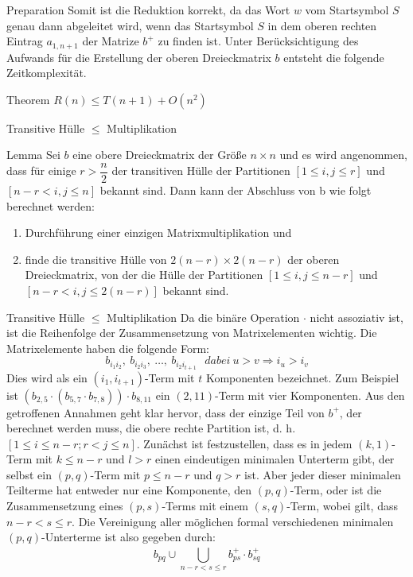 \documentclass{beamer}
\begin{document}
	\begin{frame}{Preparation}
		Somit ist die Reduktion korrekt, da das Wort $w$ vom Startsymbol $S$ genau dann abgeleitet wird, wenn das Startsymbol $S$ in dem oberen rechten Eintrag $a_{1,n+1}$ der Matrize $b^+$ zu finden ist. Unter Berücksichtigung des Aufwands für die Erstellung der oberen Dreieckmatrix $b$ entsteht die folgende Zeitkomplexität.
		\begin{block}{Theorem}
			$R(n) \le T(n+1) + O(n^2)$
		\end{block}
	\end{frame}

	\begin{frame}{Transitive Hülle $\le$ Multiplikation}
		\begin{block}{Lemma}
			Sei $b$ eine obere Dreieckmatrix der Größe $n \times n$
			und es wird angenommen, dass für einige $r > \dfrac{n}{2}$ der transitiven Hülle der Partitionen $[1\le i,j\le r]$ und $[n-r < i,j\le n]$ bekannt sind. Dann kann der Abschluss von b wie folgt berechnet werden:
			\begin{enumerate}
				\item Durchführung einer einzigen Matrixmultiplikation und
				\item finde die transitive Hülle von $2(n-r) \times 2(n-r)$ der oberen Dreieckmatrix, von der
				die Hülle der Partitionen $[1\le i,j\le n-r]$ und $[n-r < i,j\le 2(n-r)]$ bekannt sind.
			\end{enumerate}
		\end{block}
	
	\end{frame}

	\begin{frame}{Transitive Hülle $\le$ Multiplikation}
		Da die binäre Operation $\cdot$ nicht assoziativ ist, ist die Reihenfolge der Zusammensetzung von Matrixelementen wichtig. Die Matrixelemente haben die folgende Form:
		$$b_{i_1 i_2},\ b_{i_2 i_3},\ \ldots,\ b_{i_2 i_{t+1}} \ \ \ dabei \ u > v \Rightarrow  i_u > i_v$$
		Dies wird als ein $(i_1,i_{t+1})$-Term mit $t$ Komponenten bezeichnet. Zum Beispiel ist $(b_{2,5}\cdot (b_{5,7}\cdot b_{7,8}))\cdot b_{8,11}$ ein $(2, 11)$-Term mit vier Komponenten.
		Aus den getroffenen Annahmen geht klar hervor, dass der einzige Teil von $b^+$, der berechnet werden muss, die obere rechte Partition ist, d. h. $[1  \le i \le n-r; r< j \le n]$. Zunächst ist festzustellen, dass es in jedem $(k, 1)$-Term mit $k \le n-r$ und $l > r$ einen eindeutigen minimalen Unterterm gibt, der selbst ein $(p, q)$-Term mit $p \le n-r$ und $q   > r$ ist. Aber jeder dieser minimalen Teilterme hat entweder nur eine Komponente, den $(p,q)$-Term, oder ist die Zusammensetzung eines $(p, s)$-Terms mit einem $(s, q)$-Term, wobei gilt, dass $n-r< s \le r$. Die Vereinigung aller möglichen formal verschiedenen minimalen $(p,q)$-Unterterme ist also gegeben durch:
		$$b_{pq} \cup \bigcup_{n-r < s \le r}^{} b_{ps}^+ \cdot b_{sq}^+$$
	\end{frame}
	
\end{document}
